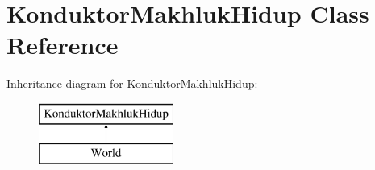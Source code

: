 \hypertarget{class_konduktor_makhluk_hidup}{}\section{Konduktor\+Makhluk\+Hidup Class Reference}
\label{class_konduktor_makhluk_hidup}
Inheritance diagram for Konduktor\+Makhluk\+Hidup\+:\begin{figure}[H]
\begin{center}
\leavevmode
\includegraphics[height=2.000000cm]{class_konduktor_makhluk_hidup}
\end{center}
\end{figure}

